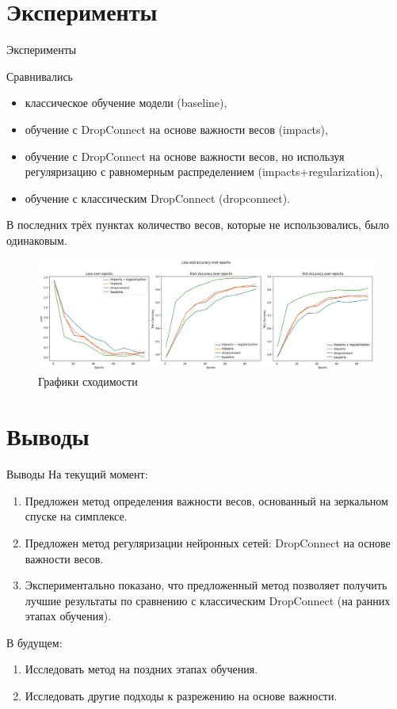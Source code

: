 \documentclass[10pt,pdf,hyperref={unicode}]{beamer}
\begin{document}
\section{Эксперименты}
\begin{frame}{Эксперименты}
\justifying

Сравнивались 
\begin{itemize}
\item классическое обучение модели (baseline), 
\item обучение с DropConnect на основе важности весов (impacts),
\item обучение с DropConnect на основе важности весов, но используя регуляризацию с равномерным распределением (impacts+regularization),
\item обучение с классическим DropConnect (dropconnect).
\end{itemize}
В последних трёх пунктах количество весов, которые не использовались, было одинаковым.

\begin{figure}[h]
\centering
\includegraphics[width=1\textwidth]{../figures/exp.png}
\caption{Графики сходимости}
\end{figure}

\end{frame}

\section{Выводы}
\begin{frame}{Выводы}
\justifying
На текущий момент:
	\begin{enumerate}
	\justifying
        \item Предложен метод определения важности весов, основанный на зеркальном спуске на симплексе.
        \item Предложен метод регуляризации нейронных сетей: DropConnect на основе важности весов.
        \item Экспериментально показано, что предложенный метод позволяет получить лучшие результаты по сравнению с классическим DropConnect (на ранних этапах обучения).
	\end{enumerate}

\bigskip

В будущем:
\begin{enumerate}
\item Исследовать метод на поздних этапах обучения.
\item Исследовать другие подходы к разрежению на основе важности.
\end{enumerate}
\end{frame}
\end{document}
